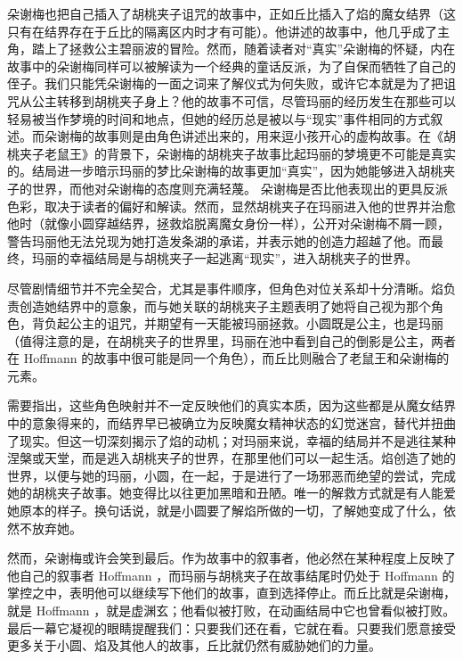 朵谢梅也把自己插入了胡桃夹子诅咒的故事中，正如丘比插入了焰的魔女结界（这只有在结界存在于丘比的隔离区内时才有可能）。他讲述的故事中，他几乎成了主角，踏上了拯救公主碧丽波的冒险。然而，随着读者对“真实”朵谢梅的怀疑，内在故事中的朵谢梅同样可以被解读为一个经典的童话反派，为了自保而牺牲了自己的侄子。我们只能凭朵谢梅的一面之词来了解仪式为何失败，或许它本就是为了把诅咒从公主转移到胡桃夹子身上？他的故事不可信，尽管玛丽的经历发生在那些可以轻易被当作梦境的时间和地点，但她的经历总是被以与“现实”事件相同的方式叙述。而朵谢梅的故事则是由角色讲述出来的，用来逗小孩开心的虚构故事。在《胡桃夹子老鼠王》的背景下，朵谢梅的胡桃夹子故事比起玛丽的梦境更不可能是真实的。结局进一步暗示玛丽的梦比朵谢梅的故事更加“真实”，因为她能够进入胡桃夹子的世界，而他对朵谢梅的态度则充满轻蔑。
朵谢梅是否比他表现出的更具反派色彩，取决于读者的偏好和解读。然而，显然胡桃夹子在玛丽进入他的世界并治愈他时（就像小圆穿越结界，拯救焰脱离魔女身份一样），公开对朵谢梅不屑一顾，警告玛丽他无法兑现为她打造发条湖的承诺，并表示她的创造力超越了他。而最终，玛丽的幸福结局是与胡桃夹子一起逃离“现实”，进入胡桃夹子的世界。

尽管剧情细节并不完全契合，尤其是事件顺序，但角色对位关系却十分清晰。焰负责创造她结界中的意象，而与她关联的胡桃夹子主题表明了她将自己视为那个角色，背负起公主的诅咒，并期望有一天能被玛丽拯救。小圆既是公主，也是玛丽（值得注意的是，在胡桃夹子的世界里，玛丽在池中看到自己的倒影是公主，两者在 Hoffmann 的故事中很可能是同一个角色），而丘比则融合了老鼠王和朵谢梅的元素。

需要指出，这些角色映射并不一定反映他们的真实本质，因为这些都是从魔女结界中的意象得来的，而结界早已被确立为反映魔女精神状态的幻觉迷宫，替代并扭曲了现实。但这一切深刻揭示了焰的动机；对玛丽来说，幸福的结局并不是逃往某种涅槃或天堂，而是逃入胡桃夹子的世界，在那里他们可以一起生活。焰创造了她的世界，以便与她的玛丽，小圆，在一起，于是进行了一场邪恶而绝望的尝试，完成她的胡桃夹子故事。她变得比以往更加黑暗和丑陋。唯一的解救方式就是有人能爱她原本的样子。换句话说，就是小圆要了解焰所做的一切，了解她变成了什么，依然不放弃她。

然而，朵谢梅或许会笑到最后。作为故事中的叙事者，他必然在某种程度上反映了他自己的叙事者 Hoffmann ，而玛丽与胡桃夹子在故事结尾时仍处于 Hoffmann 的掌控之中，表明他可以继续写下他们的故事，直到选择停止。而丘比就是朵谢梅，就是 Hoffmann ，就是虚渊玄；他看似被打败，在动画结局中它也曾看似被打败。最后一幕它凝视的眼睛提醒我们：只要我们还在看，它就在看。只要我们愿意接受更多关于小圆、焰及其他人的故事，丘比就仍然有威胁她们的力量。